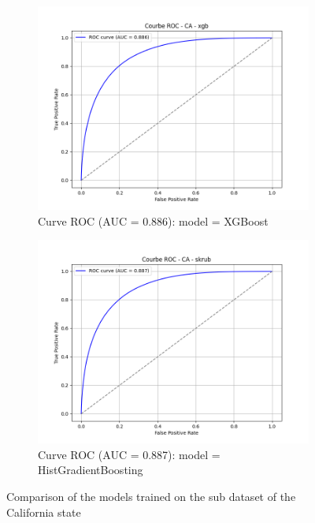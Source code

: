 \begin{figure}[h]
    \begin{subfigure}[b]{0.48\textwidth}
        \includegraphics[width=\textwidth]{Images/curve_roc_folktables/roc_curve_CA_xgb.png}
        \caption{Curve ROC (AUC = 0.886): model = XGBoost}
        \label{fig:ca_xgb}
    \end{subfigure}
    \hfill
    \begin{subfigure}[b]{0.48\textwidth}
        \includegraphics[width=\textwidth]{Images/curve_roc_folktables/roc_curve_CA_skrub.png}
        \caption{Curve ROC (AUC = 0.887): model = HistGradientBoosting}
        \label{fig:ca_skrub}
    \end{subfigure}
    \caption{Comparison of the models trained on the sub dataset of the California state}
    \label{fig:roc_ca}
\end{figure}


